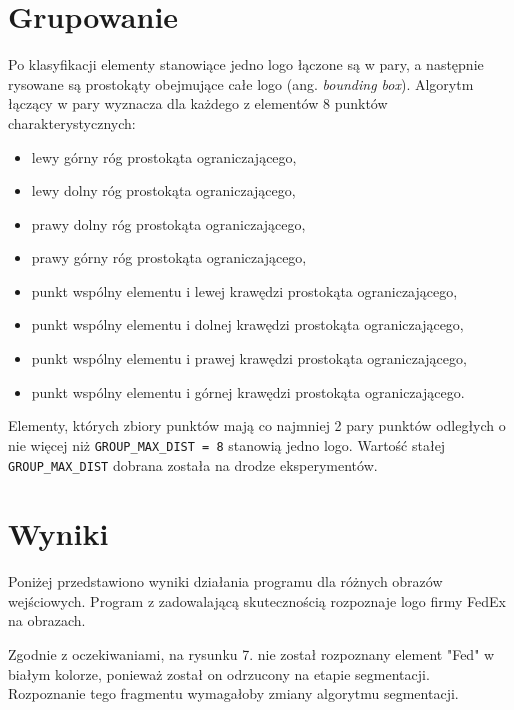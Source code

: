 \documentclass[12pt, oneside, final]{report}
\begin{document}
\section*{Grupowanie}
Po klasyfikacji elementy stanowiące jedno logo łączone są w pary, a następnie rysowane są prostokąty obejmujące całe logo (ang. \textit{bounding box}). Algorytm łączący w pary wyznacza dla każdego z elementów 8 punktów charakterystycznych:
\begin{itemize}
	\item lewy górny róg prostokąta ograniczającego,
	\item lewy dolny róg prostokąta ograniczającego,
	\item prawy dolny róg prostokąta ograniczającego,
	\item prawy górny róg prostokąta ograniczającego,
	\item punkt wspólny elementu i lewej krawędzi prostokąta ograniczającego,
	\item punkt wspólny elementu i dolnej krawędzi prostokąta ograniczającego,
	\item punkt wspólny elementu i prawej krawędzi prostokąta ograniczającego,
	\item punkt wspólny elementu i górnej krawędzi prostokąta ograniczającego.
\end{itemize}
Elementy, których zbiory punktów mają co najmniej 2 pary punktów odległych o nie więcej niż \texttt{GROUP\_MAX\_DIST = 8} stanowią jedno logo. Wartość stałej \texttt{GROUP\_MAX\_DIST} dobrana została na drodze eksperymentów.

\section*{Wyniki}
Poniżej przedstawiono wyniki działania programu dla różnych obrazów wejściowych. Program z zadowalającą skutecznością rozpoznaje logo firmy FedEx na obrazach.

Zgodnie z oczekiwaniami, na rysunku 7. nie został rozpoznany element "Fed" w białym kolorze, ponieważ został on odrzucony na etapie segmentacji. Rozpoznanie tego fragmentu wymagałoby zmiany algorytmu segmentacji.
\end{document}
